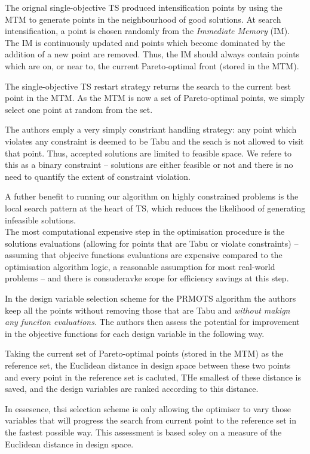 \documentclass[pdftex,11pt]{article}
\begin{document}
The orignal single-objective TS produced intensification points by using the MTM to generate points in the neighbourhood of good solutions. At search intensification, a point is chosen randomly from the \emph{Immediate Memory} (IM). The IM is continuously updated and points which become dominated by the addition of a new point are removed. Thus, the IM should always contain points which are on, or near to, the current Pareto-optimal front (stored in the MTM).

The single-objective TS restart strategy returns the search to the current best point in the MTM. As the MTM is now a set of Pareto-optimal points, we simply select one point at random from the set.

The authors emply a very simply constriant handling strategy: any point which violates any constraint is deemed to be Tabu and the seach is not allowed to visit that point. Thus, accepted solutions are limited to feasible space. We refere to this as a binary constraint -- solutions are either feasible or not and there is no need to quantify the extent of constraint violation.

A futher benefit to running our algorithm on highly constrained problems is the local search pattern at the heart of TS, which reduces the likelihood of generating infeasible solutions.\\

The most computational expensive step in the optimisation procedure is the solutions evaluations (allowing for points that are Tabu or violate constraints) -- assuming that objecive functions evaluations are expensive compared to the optimisation algorithm logic, a reasonable assumption for most real-world problems -- and there is consuderavke scope for efficiency savings at this step.

In the design variable selection scheme for the PRMOTS algorithm the authors keep all the points without removing those that are Tabu and \emph{without makign any funciton evaluations}. The authors then assess the potential for improvement in the objective functions for each design variable in the following way.

Taking the current set of Pareto-optimal points (stored in the MTM) as the reference set, the Euclidean distance in design space between these two points and every point in the reference set is cacluted, THe smallest of these distance is saved, and the design variables are ranked according to this distance.

In essesence, thsi selection scheme is only allowing the optimiser to vary those variables that will progress the search from current point to the reference set in the fastest possible way. This assessment is based soley on a measure of the Euclidean distance in design space.\\
\end{document}
